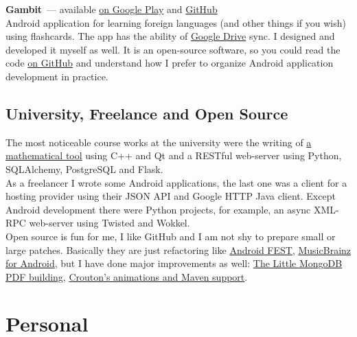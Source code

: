       \textbf{Gambit}~--- available \href{https://play.google.com/store/apps/details?id=ru.ming13.gambit}{on Google Play}
        and \href{https://github.com/ming13/gambit}{GitHub} \\

        Android application for learning foreign languages
        (and other things if you wish) using flashcards.
        The app has the ability of \href{https://drive.google.com}{Google Drive} sync.
        I designed and developed
        it myself as well. It is an open-source software, so you could read the code
        \href{https://github.com/ming13/gambit}{on GitHub} and understand
        how I prefer to organize Android application development in practice.

    \subsection*{University, Freelance and Open Source}

      The most noticeable course works at the university were the writing of
      \href{https://github.com/ming13/aequatio}{a mathematical tool}
      using C++ and Qt and a RESTful web-server using Python,
      SQLAlchemy, PostgreSQL and Flask. \\

      As a freelancer I wrote some Android applications, the last one was
      a client for a hosting provider using their JSON API
      and Google HTTP Java client.
      Except Android development there were Python projects, for example,
      an async XML-RPC web-server using Twisted and Wokkel. \\

      Open source is fun for me, I like GitHub and I am not shy to prepare
      small or large patches. Basically they are just refactoring like
      \href{https://github.com/square/fest-android/commits?author=ming13}{Android FEST},
      \href{https://github.com/jdamcd/musicbrainz-android/commits?author=ming13}{MusicBrainz for Android},
      but I have done major improvements as well:
      \href{https://github.com/karlseguin/the-little-mongodb-book/pull/16}{The Little MongoDB PDF building},
      \href{https://github.com/keyboardsurfer/Crouton/pulls/ming13?state=closed}{Crouton’s animations and Maven support}.


  \section*{Personal}

